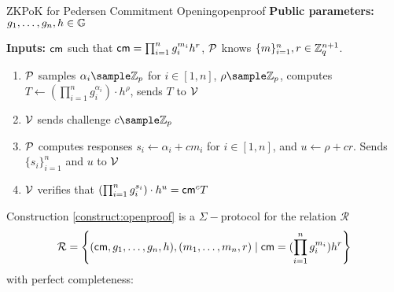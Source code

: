 \begin{protocol}{ZKPoK for Pedersen Commitment Opening}{openproof}
    \vspace{1em}
    \textbf{Public parameters:}  $g_1, \dots, g_n, h \in \mathbb{G}$

    \textbf{Inputs:} $\mathsf{cm}$ such that $\mathsf{cm} = \prod_{i=1}^ng_i^{m_i}h^r$, \;    $\mathcal{P}$ knows $\{m\}_{i=1}^n, r \in \mathbb{Z}_q^{n+1}$.

    \vspace{1em}

    \begin{enumerate}
        \item $\mathcal{P}$ samples $\alpha_i \sample \Z_p$ for $i \in [1,n]$, $\rho \sample \Z_p$, computes $T \gets (\prod_{i=1}^ng_i^{\alpha_i})\cdot h^{\rho}$, sends $T$ to $\mathcal{V}$
        
        \item $\mathcal{V}$ sends challenge $c \sample \Z_p$
    
        \item $\mathcal{P}$ computes responses $s_i \gets \alpha_i + cm_i$ for $i \in [1,n]$, and $u \gets \rho + cr$. Sends $\{s_i\}_{i=1}^n$ and $u$ to $\mathcal{V}$
    
        \item $\mathcal{V}$ verifies that $ (\prod_{i=1}^ng_i^{s_i})\cdot h^u = \mathsf{cm}^cT$
    \end{enumerate}
\end{protocol}

\begin{theorem}
    Construction \ref{construct:openproof} is a $\Sigma-$protocol for the relation $\mathcal{R}$
    \[
        \mathcal{R} = \left\{ (\mathsf{cm},g_1,\dots,g_n,h),(m_1,\dots,m_n,r) \; | \; \mathsf{cm} = (\prod_{i=1}^ng_i^{m_i})h^r \right\}
    \]
    with perfect completeness: 
\end{theorem}


